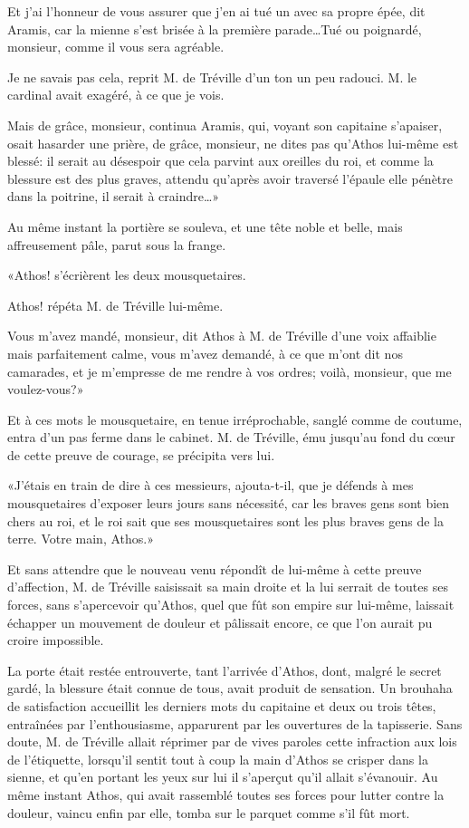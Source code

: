 \speak  Et j'ai l'honneur de vous assurer que j'en ai tué un avec sa propre épée, dit Aramis, car la mienne s'est brisée à la première parade\dots Tué ou poignardé, monsieur, comme il vous sera agréable. 

\speak  Je ne savais pas cela, reprit M. de Tréville d'un ton un peu radouci. M. le cardinal avait exagéré, à ce que je vois. 

\speak  Mais de grâce, monsieur, continua Aramis, qui, voyant son capitaine s'apaiser, osait hasarder une prière, de grâce, monsieur, ne dites pas qu'Athos lui-même est blessé: il serait au désespoir que cela parvint aux oreilles du roi, et comme la blessure est des plus graves, attendu qu'après avoir traversé l'épaule elle pénètre dans la poitrine, il serait à craindre\dots» 

Au même instant la portière se souleva, et une tête noble et belle, mais affreusement pâle, parut sous la frange. 

«Athos! s'écrièrent les deux mousquetaires. 

\speak  Athos! répéta M. de Tréville lui-même. 

\speak  Vous m'avez mandé, monsieur, dit Athos à M. de Tréville d'une voix affaiblie mais parfaitement calme, vous m'avez demandé, à ce que m'ont dit nos camarades, et je m'empresse de me rendre à vos ordres; voilà, monsieur, que me voulez-vous?» 

Et à ces mots le mousquetaire, en tenue irréprochable, sanglé comme de coutume, entra d'un pas ferme dans le cabinet. M. de Tréville, ému jusqu'au fond du cœur de cette preuve de courage, se précipita vers lui. 

«J'étais en train de dire à ces messieurs, ajouta-t-il, que je défends à mes mousquetaires d'exposer leurs jours sans nécessité, car les braves gens sont bien chers au roi, et le roi sait que ses mousquetaires sont les plus braves gens de la terre. Votre main, Athos.» 

Et sans attendre que le nouveau venu répondît de lui-même à cette preuve d'affection, M. de Tréville saisissait sa main droite et la lui serrait de toutes ses forces, sans s'apercevoir qu'Athos, quel que fût son empire sur lui-même, laissait échapper un mouvement de douleur et pâlissait encore, ce que l'on aurait pu croire impossible. 

La porte était restée entrouverte, tant l'arrivée d'Athos, dont, malgré le secret gardé, la blessure était connue de tous, avait produit de sensation. Un brouhaha de satisfaction accueillit les derniers mots du capitaine et deux ou trois têtes, entraînées par l'enthousiasme, apparurent par les ouvertures de la tapisserie. Sans doute, M. de Tréville allait réprimer par de vives paroles cette infraction aux lois de l'étiquette, lorsqu'il sentit tout à coup la main d'Athos se crisper dans la sienne, et qu'en portant les yeux sur lui il s'aperçut qu'il allait s'évanouir. Au même instant Athos, qui avait rassemblé toutes ses forces pour lutter contre la douleur, vaincu enfin par elle, tomba sur le parquet comme s'il fût mort. 

